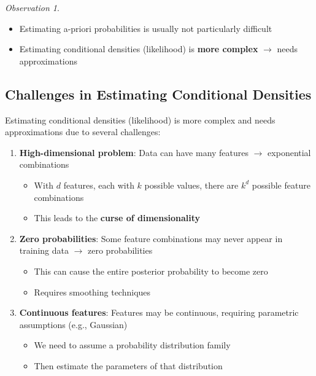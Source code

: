 \documentclass[11pt,a4paper]{article}
\theoremstyle{definition}
\theoremstyle{plain}
\theoremstyle{remark}
\newtheorem*{observation}{Observation}
\begin{document}
\begin{observation}
\begin{itemize}
    \item Estimating a-priori probabilities is usually not particularly difficult
    
    \item Estimating conditional densities (likelihood) is \textbf{more complex} $\rightarrow$ needs approximations
\end{itemize}
\end{observation}

\subsection{Challenges in Estimating Conditional Densities}

Estimating conditional densities (likelihood) is more complex and needs approximations due to several challenges:

\begin{enumerate}
    \item \textbf{High-dimensional problem}: Data can have many features $\rightarrow$ exponential combinations
    \begin{itemize}
        \item With $d$ features, each with $k$ possible values, there are $k^d$ possible feature combinations
        \item This leads to the \textbf{curse of dimensionality}
    \end{itemize}
    
    \item \textbf{Zero probabilities}: Some feature combinations may never appear in training data $\rightarrow$ zero probabilities
    \begin{itemize}
        \item This can cause the entire posterior probability to become zero
        \item Requires smoothing techniques
    \end{itemize}
    
    \item \textbf{Continuous features}: Features may be continuous, requiring parametric assumptions (e.g., Gaussian)
    \begin{itemize}
        \item We need to assume a probability distribution family
        \item Then estimate the parameters of that distribution
    \end{itemize}
\end{enumerate}
\end{document}
